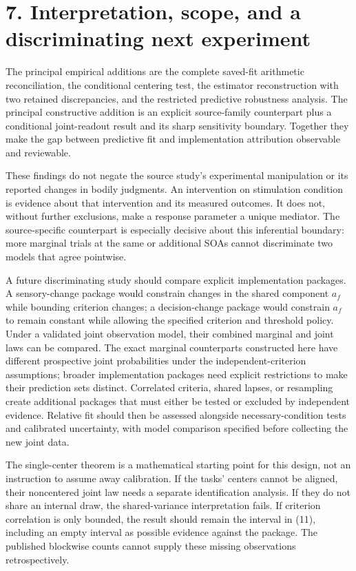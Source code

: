 \documentclass[
  11pt,
]{article}
\let\ctdoldsection\section
\renewcommand{\section}{\Needspace{8\baselineskip}\ctdoldsection}
\begin{document}
\hypertarget{interpretation-scope-and-a-discriminating-next-experiment}{%
\section{7. Interpretation, scope, and a discriminating next
experiment}\label{interpretation-scope-and-a-discriminating-next-experiment}}

The principal empirical additions are the complete saved-fit arithmetic
reconciliation, the conditional centering test, the estimator
reconstruction with two retained discrepancies, and the restricted
predictive robustness analysis. The principal constructive addition is
an explicit source-family counterpart plus a conditional joint-readout
result and its sharp sensitivity boundary. Together they make the gap
between predictive fit and implementation attribution observable and
reviewable.

These findings do not negate the source study's experimental
manipulation or its reported changes in bodily judgments. An
intervention on stimulation condition is evidence about that
intervention and its measured outcomes. It does not, without further
exclusions, make a response parameter a unique mediator. The
source-specific counterpart is especially decisive about this
inferential boundary: more marginal trials at the same or additional
SOAs cannot discriminate two models that agree pointwise.

A future discriminating study should compare explicit implementation
packages. A sensory-change package would constrain changes in the shared
component \(a_f\) while bounding criterion changes; a decision-change
package would constrain \(a_f\) to remain constant while allowing the
specified criterion and threshold policy. Under a validated joint
observation model, their combined marginal and joint laws can be
compared. The exact marginal counterparts constructed here have
different prospective joint probabilities under the
independent-criterion assumptions; broader implementation packages need
explicit restrictions to make their prediction sets distinct. Correlated
criteria, shared lapses, or resampling create additional packages that
must either be tested or excluded by independent evidence. Relative fit
should then be assessed alongside necessary-condition tests and
calibrated uncertainty, with model comparison specified before
collecting the new joint data.

The single-center theorem is a mathematical starting point for this
design, not an instruction to assume away calibration. If the tasks'
centers cannot be aligned, their noncentered joint law needs a separate
identification analysis. If they do not share an internal draw, the
shared-variance interpretation fails. If criterion correlation is only
bounded, the result should remain the interval in (11), including an
empty interval as possible evidence against the package. The published
blockwise counts cannot supply these missing observations
retrospectively.
\end{document}
